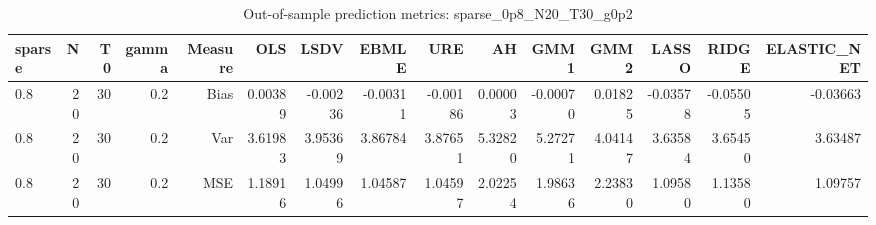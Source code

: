 \begin{table}[!htbp]\centering
\caption{Out-of-sample prediction metrics: sparse_0p8_N20_T30_g0p2}
\label{tab:table3_sparse_0p8_N20_T30_g0p2}
\begin{tabular}{lrrrrrrrrrrrrrr}
\hline
sparse & N & T0 & gamma & Measure & OLS & LSDV & EBMLE & URE & AH & GMM1 & GMM2 & LASSO & RIDGE & ELASTIC_NET \\
\hline
0.8 & 20 & 30 & 0.2 & Bias & 0.00389 & -0.00236 & -0.00311 & -0.00186 & 0.00003 & -0.00070 & 0.01825 & -0.03578 & -0.05505 & -0.03663 \\
0.8 & 20 & 30 & 0.2 & Var & 3.61983 & 3.95369 & 3.86784 & 3.87651 & 5.32820 & 5.27271 & 4.04147 & 3.63584 & 3.65450 & 3.63487 \\
0.8 & 20 & 30 & 0.2 & MSE & 1.18916 & 1.04996 & 1.04587 & 1.04597 & 2.02254 & 1.98636 & 2.23830 & 1.09580 & 1.13580 & 1.09757 \\
\hline
\end{tabular}
\end{table}

